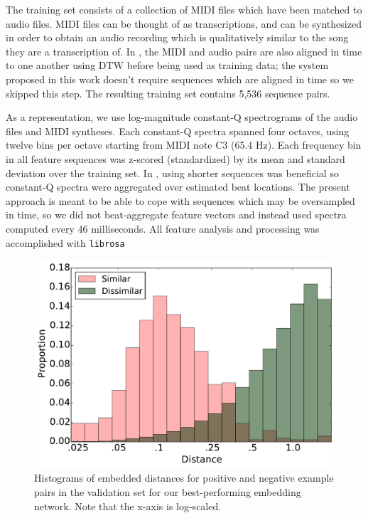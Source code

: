 \documentclass{article}
\begin{document}
The training set consists of a collection of MIDI files which have been matched to audio files.
MIDI files can be thought of as transcriptions, and can be synthesized in order to obtain an audio recording which is qualitatively similar to the song they are a transcription of.
In \cite{raffel2015large}, the MIDI and audio pairs are also aligned in time to one another using DTW before being used as training data; the system proposed in this work doesn't require sequences which are aligned in time so we skipped this step.
The resulting training set contains 5,536 sequence pairs.

As a representation, we use log-magnitude constant-Q spectrograms \cite{brown1991calculation} of the audio files and MIDI syntheses.
Each constant-Q spectra spanned four octaves, using twelve bins per octave starting from MIDI note C3 (65.4 Hz).
Each frequency bin in all feature sequences was z-scored (standardized) by its mean and standard deviation over the training set.
In \cite{raffel2015large}, using shorter sequences was beneficial so constant-Q spectra were aggregated over estimated beat locations.
The present approach is meant to be able to cope with sequences which may be oversampled in time, so we did not beat-aggregate feature vectors and instead used spectra computed every 46 milliseconds.
All feature analysis and processing was accomplished with \texttt{librosa} \cite{mcfee2015librosa, mcfee2015librosa_scipy}

\begin{figure}[t]
  \centering
  \includegraphics[width=\columnwidth]{distances.pdf}
  \caption{Histograms of embedded distances for positive and negative example pairs in the validation set for our best-performing embedding network.  Note that the x-axis is log-scaled.}
  \label{fig:distances}
\end{figure}
\end{document}
